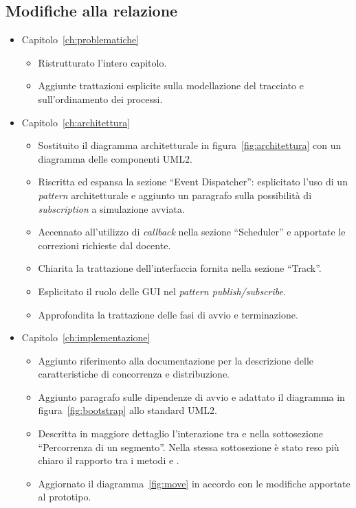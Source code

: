 \subsection*{Modifiche alla relazione}
\begin{itemize}
\item Capitolo~\ref{ch:problematiche}
	\begin{itemize}
	\item Ristrutturato l'intero capitolo.
	\item Aggiunte trattazioni esplicite sulla modellazione del tracciato e sull'ordinamento dei processi.
	\end{itemize}
\item Capitolo~\ref{ch:architettura}
	\begin{itemize}
	\item Sostituito il diagramma architetturale in figura~\ref{fig:architettura} con un diagramma delle componenti UML2.
	\item Riscritta ed espansa la sezione ``Event Dispatcher'': esplicitato l'uso di un \textit{pattern} architetturale e aggiunto un paragrafo sulla possibilità di \textit{subscription} a simulazione avviata.
	\item Accennato all'utilizzo di \textit{callback} nella sezione ``Scheduler'' e apportate le correzioni richieste dal docente.
	\item Chiarita la trattazione dell'interfaccia fornita nella sezione ``Track''.
	\item Esplicitato il ruolo delle GUI nel \textit{pattern \mbox{publish/subscribe}}.
	\item Approfondita la trattazione delle fasi di avvio e terminazione.
	\end{itemize}
\item Capitolo~\ref{ch:implementazione}
	\begin{itemize}
	\item Aggiunto riferimento alla documentazione \Erlang{} per la descrizione delle caratteristiche di concorrenza e distribuzione.
	\item Aggiunto paragrafo sulle dipendenze di avvio e adattato il diagramma in figura~\ref{fig:bootstrap} allo standard UML2.
	\item Descritta in maggiore dettaglio l'interazione tra \car{} e \track{} nella sottosezione ``Percorrenza di un segmento''. Nella stessa sottosezione è stato reso più chiaro il rapporto tra i metodi  e .
	\item Aggiornato il diagramma~\ref{fig:move} in accordo con le modifiche apportate al prototipo.

\end{itemize}
\end{itemize}
